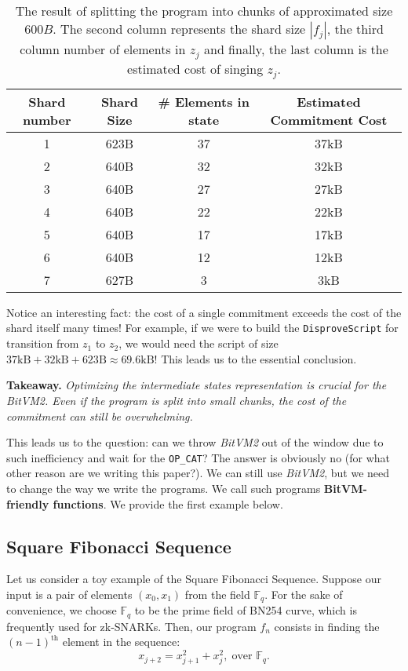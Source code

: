 \documentclass{iacrtrans}
\begin{document}
\begin{table}[H]
  \centering
  \begin{tabular}{cccc}
    \toprule
    \textbf{Shard number} & \textbf{Shard Size} & \textbf{\# Elements
    in state} & \textbf{Estimated Commitment Cost} \\
    \midrule
    1 & 623B & 37 & 37kB \\
    2 & 640B & 32 & 32kB \\
    3 & 640B & 27 & 27kB \\
    4 & 640B & 22 & 22kB \\
    5 & 640B & 17 & 17kB \\
    6 & 640B & 12 & 12kB \\
    7 & 627B & 3  & 3kB \\
    \bottomrule
  \end{tabular}
  \caption{The result of splitting the program into chunks of
    approximated size $600B$. The second column represents the shard
    size $|f_j|$, the third column number of elements in $z_j$ and
    finally, the last column is the estimated cost of singing
  $z_j$.}\label{tab:u32_split}
\end{table}

Notice an interesting fact: the cost of a single commitment exceeds the cost of
the shard itself many times! For example, if we were to build the
\texttt{DisproveScript} for transition from $z_1$ to $z_2$, we would need the
script of size $37\text{kB}+32\text{kB}+623\text{B} \approx 69.6\text{kB}$! This
leads us to the essential conclusion.

\textbf{Takeaway.} \textit{Optimizing the intermediate states
  representation is crucial for the BitVM2. Even if the program is
split into small chunks, the cost of the commitment can still be overwhelming.}

This leads us to the question: can we throw \textit{BitVM2} out of
the window due to such
inefficiency and wait for the \texttt{OP\_CAT}? The answer is obviously no (for
what other reason are we writing this paper?). We can still use
\textit{BitVM2}, but we
need to change the way we write the programs. We call such programs
\textbf{BitVM-friendly functions}. We provide the first example below.

\subsection{Square Fibonacci Sequence}
Let us consider a toy example of the Square Fibonacci Sequence. Suppose our
input is a pair of elements $(x_0,x_1)$ from the field $\mathbb{F}_q$. For the
sake of convenience, we choose $\mathbb{F}_q$ to be the prime field of BN254
curve, which is frequently used for zk-SNARKs. Then, our program $f_n$ consists
in finding the ${(n-1)}^{\text{th}}$ element in the sequence:
\begin{equation*}
  x_{j+2} = x_{j+1}^2 + x_j^2, \; \text{over $\mathbb{F}_q$.}
\end{equation*}
\end{document}
